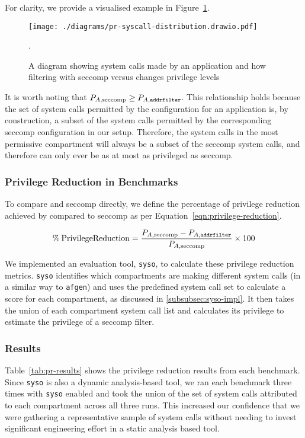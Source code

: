 For clarity, we provide a visualised example in
Figure~\ref{fig:pr}.

\begin{figure}[htbp]
    \centering
    \texttt{[image: ./diagrams/pr-syscall-distribution.drawio.pdf]}
    \caption{A diagram showing system calls made by an application and how
    filtering with seccomp versus \af changes privilege levels}.
    \label{fig:pr}
\end{figure}


It is worth noting that $P_{A, \text{seccomp}} \ge P_{A, \texttt{addrfilter}}$. This
relationship holds because the set of system calls permitted by the \af 
configuration for an application is, by construction, a subset of the system
calls permitted by the corresponding seccomp configuration in our setup.
Therefore, the system calls in the most permissive \af compartment will always
be a subset of the seccomp system calls, and therefore \af can only ever be as at
most as privileged as seccomp.

\subsubsection{Privilege Reduction in Benchmarks}

To compare \af and seccomp directly, we define the percentage of privilege
reduction achieved by \af compared to seccomp as per 
Equation~\ref{eqn:privilege-reduction}.  

\begin{equation}\label{eqn:privilege-reduction}
    \% \: \mathrm{Privilege Reduction} = 
    \frac{P_{A, \text{seccomp}} - P_{A, \text{\texttt{addrfilter}}}}{P_{A, \text{seccomp}}} 
            \times 100
\end{equation}

We implemented an evaluation tool, \texttt{syso}, to calculate these privilege
reduction metrics. \texttt{syso} identifies which compartments are making
different system calls (in a similar way to \texttt{afgen}) and uses the
predefined system call set to calculate a score for each compartment, as
discussed in \ref{subsubsec:syso-impl}. It then takes the union of each
compartment system call list and calculates its privilege to
estimate the privilege of a seccomp filter.

\subsubsection{Results}

Table~\ref{tab:pr-results} shows the privilege reduction results from each benchmark.
Since \texttt{syso} is also a dynamic analysis-based tool, we ran each
benchmark three times with \texttt{syso} enabled and took the union of the set of
system calls attributed to each compartment across all three runs. This
increased our confidence that we were gathering a representative sample of
system calls without needing to invest significant engineering effort in a static
 analysis based tool. 

